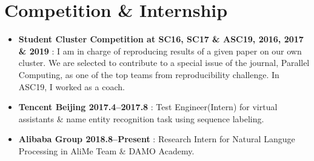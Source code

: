 \documentclass[letterpaper]{article}
\begin{document}
\section*{Competition \& Internship}
\begin{itemize}
  \item \textbf{Student Cluster Competition at SC16, SC17 \& ASC19, 2016, 2017 \& 2019} : I am in charge of reproducing results of a given paper on our own cluster. We are selected to contribute to a special issue of the journal, Parallel Computing, as one of the top teams from reproducibility challenge. In ASC19, I worked as a coach.
  \item \textbf{Tencent Beijing 2017.4--2017.8} : Test Engineer(Intern) for virtual assistants \& name entity recognition task using sequence labeling.
  \item \textbf{Alibaba Group 2018.8--Present} : Research Intern for Natural Languge Processing in AliMe Team \& DAMO Academy.
\end{itemize}
\end{document}
